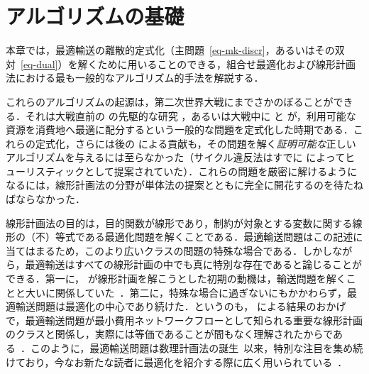 
\chapter{アルゴリズムの基礎}
\label{c-algo-basics} %

本章では，最適輸送の離散的定式化（主問題~\eqref{eq-mk-discr}，あるいはその双対~\eqref{eq-dual}）を解くために用いることのできる，組合せ最適化および線形計画法における最も一般的なアルゴリズム的手法を解説する．

これらのアルゴリズムの起源は，第二次世界大戦にまでさかのぼることができる．それは大戦直前の \citeauthor{tolstoi1930methods} の先駆的な研究 \citeyearpar{tolstoi1930methods}，あるいは大戦中に \citet{Hitchcock41} と \citet{Kantorovich42} が，利用可能な資源を消費地へ最適に配分するという一般的な問題を定式化した時期である．これらの定式化，さらには後の \citet{koopmans1949optimum} による貢献も，その問題を解く\emph{証明可能な}正しいアルゴリズムを与えるには至らなかった（サイクル違反法はすでに \citet{tolstoi1939metody} によってヒューリスティックとして提案されていた）．これらの問題を厳密に解けるようになるには，線形計画法の分野が単体法の提案とともに完全に開花するのを待たねばならなかった．

線形計画法の目的は，目的関数が線形であり，制約が対象とする変数に関する線形の（不）等式である最適化問題を解くことである．最適輸送問題はこの記述に当てはまるため，このより広いクラスの問題の特殊な場合である．しかしながら，最適輸送はすべての線形計画の中でも真に特別な存在であると論じることができる．第一に，\citeauthor{dantzig1991} が線形計画を解こうとした初期の動機は，輸送問題を解くことと大いに関係していた~\citep[p. 210]{dantzig49econometrica}．第二に，特殊な場合に過ぎないにもかかわらず，最適輸送問題は最適化の中心であり続けた．というのも，\citet{ford1962flows} による結果のおかげで，最適輸送問題が最小費用ネットワークフローとして知られる重要な線形計画のクラスと関係し，実際には等価であることが間もなく理解されたからである~\citep[p. 213, Lem. 9.3]{korte2012combinatorial}．このように，最適輸送問題は数理計画法の誕生~\citep{Dantzig51}以来，特別な注目を集め続けており，今なお新たな読者に最適化を紹介する際に広く用いられている~\citep[\S1, p. 4]{nocedal}．

